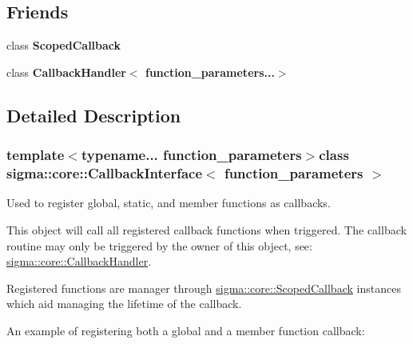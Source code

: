 \subsection*{Friends}
\begin{DoxyCompactItemize}
\item 
\hypertarget{classsigma_1_1core_1_1_callback_interface_a3414685dbc2eaa79d5e5af6729f74c0f}{class {\bfseries Scoped\-Callback}}\label{classsigma_1_1core_1_1_callback_interface_a3414685dbc2eaa79d5e5af6729f74c0f}

\item 
\hypertarget{classsigma_1_1core_1_1_callback_interface_a94b1ac13fdd15a778578dbb449af3b9e}{class {\bfseries Callback\-Handler$<$ function\-\_\-parameters...$>$}}\label{classsigma_1_1core_1_1_callback_interface_a94b1ac13fdd15a778578dbb449af3b9e}

\end{DoxyCompactItemize}


\subsection{Detailed Description}
\subsubsection*{template$<$typename... function\-\_\-parameters$>$class sigma\-::core\-::\-Callback\-Interface$<$ function\-\_\-parameters $>$}

Used to register global, static, and member functions as callbacks. 

This object will call all registered callback functions when triggered. The callback routine may only be triggered by the owner of this object, see\-: \hyperlink{classsigma_1_1core_1_1_callback_handler}{sigma\-::core\-::\-Callback\-Handler}.

Registered functions are manager through \hyperlink{classsigma_1_1core_1_1_scoped_callback}{sigma\-::core\-::\-Scoped\-Callback} instances which aid managing the lifetime of the callback.

An example of registering both a global and a member function callback\-:


